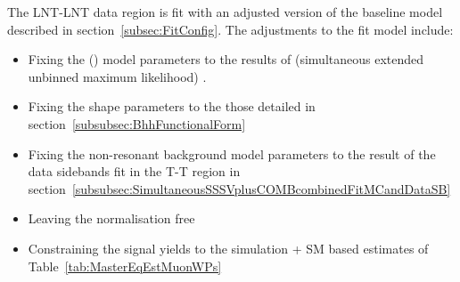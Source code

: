 The LNT-LNT data region is fit with an adjusted version of the baseline model described in section~\ref{subsec:FitConfig}. 
The adjustments to the fit model include:
\begin{itemize}
  \item Fixing the \Bs (\Bd) model parameters to the results of (simultaneous extended unbinned maximum likelihood) . 
  \item Fixing the \Bhh shape parameters to the those detailed in section~\ref{subsubsec:BhhFunctionalForm}
  \item Fixing the non-resonant background model parameters to the result of the data sidebands fit in the T-T region in section~\ref{subsubsec:SimultaneousSSSVplusCOMBcombinedFitMCandDataSB}
  \item Leaving the \Bhh normalisation free
  \item Constraining the signal yields to the simulation + SM based estimates of Table~\ref{tab:MasterEqEstMuonWPs}
\end{itemize}

